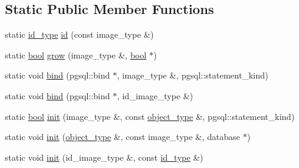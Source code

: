 \subsection*{Static Public Member Functions}
\begin{DoxyCompactItemize}
\item 
static \hyperlink{classodb_1_1access_1_1object__traits_3_01_1_1_graph_class_01_4_adf9a24fcdfb5c36b924d7f5a4b0d76df}{id\+\_\+type} \hyperlink{classodb_1_1access_1_1object__traits__impl_3_01_1_1_graph_class_00_01id__pgsql_01_4_a71d7128877238baa33d57474196949dc}{id} (const image\+\_\+type \&)
\item 
static \hyperlink{classodb_1_1access_1_1object__traits_3_01_1_1_graph_class_01_4_adb6d76b31575782f2c201eb3ab510e59}{bool} \hyperlink{classodb_1_1access_1_1object__traits__impl_3_01_1_1_graph_class_00_01id__pgsql_01_4_a6de086d6b212ab53adea8a0f841b9d3a}{grow} (image\+\_\+type \&, \hyperlink{classodb_1_1access_1_1object__traits_3_01_1_1_graph_class_01_4_adb6d76b31575782f2c201eb3ab510e59}{bool} $\ast$)
\item 
static void \hyperlink{classodb_1_1access_1_1object__traits__impl_3_01_1_1_graph_class_00_01id__pgsql_01_4_a7aaf974beb5051875a3d3f2275eafb03}{bind} (pgsql\+::bind $\ast$, image\+\_\+type \&, pgsql\+::statement\+\_\+kind)
\item 
static void \hyperlink{classodb_1_1access_1_1object__traits__impl_3_01_1_1_graph_class_00_01id__pgsql_01_4_aa3a82c1d5ad2d2007e31559e3ad2847d}{bind} (pgsql\+::bind $\ast$, id\+\_\+image\+\_\+type \&)
\item 
static \hyperlink{classodb_1_1access_1_1object__traits_3_01_1_1_graph_class_01_4_adb6d76b31575782f2c201eb3ab510e59}{bool} \hyperlink{classodb_1_1access_1_1object__traits__impl_3_01_1_1_graph_class_00_01id__pgsql_01_4_a703bed86e5e5de0741ab900276c5029c}{init} (image\+\_\+type \&, const \hyperlink{classodb_1_1access_1_1object__traits_3_01_1_1_graph_class_01_4_a0808c9b0dc597786e3b5e11fc0f63e43}{object\+\_\+type} \&, pgsql\+::statement\+\_\+kind)
\item 
static void \hyperlink{classodb_1_1access_1_1object__traits__impl_3_01_1_1_graph_class_00_01id__pgsql_01_4_afe9463c0451da4cbbeae396c22904c59}{init} (\hyperlink{classodb_1_1access_1_1object__traits_3_01_1_1_graph_class_01_4_a0808c9b0dc597786e3b5e11fc0f63e43}{object\+\_\+type} \&, const image\+\_\+type \&, database $\ast$)
\item 
static void \hyperlink{classodb_1_1access_1_1object__traits__impl_3_01_1_1_graph_class_00_01id__pgsql_01_4_a5bfcb52e67c37cb4918a54280fdda420}{init} (id\+\_\+image\+\_\+type \&, const \hyperlink{classodb_1_1access_1_1object__traits_3_01_1_1_graph_class_01_4_adf9a24fcdfb5c36b924d7f5a4b0d76df}{id\+\_\+type} \&)

\end{DoxyCompactItemize}

